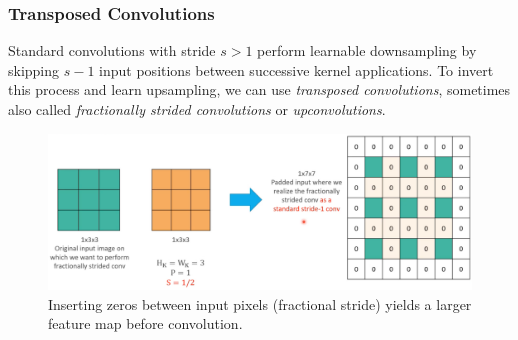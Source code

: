 




\subsubsection{Transposed Convolutions}

Standard convolutions with stride \(s>1\) perform learnable downsampling by skipping \(s-1\) input positions between successive kernel applications. To invert this process and learn upsampling, we can use \emph{transposed convolutions}, sometimes also called \emph{fractionally strided convolutions} or \emph{upconvolutions}.

\begin{figure}[htbp]
  \centering
  \includegraphics[width=0.7\linewidth]{./img/fractional_conv.png}
  \caption{Inserting zeros between input pixels (fractional stride) yields a larger feature map before convolution.}
  \label{fig:fractional_conv}
\end{figure}

